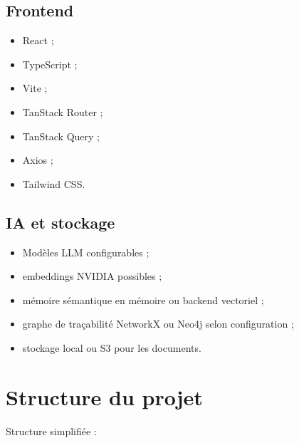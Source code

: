 \documentclass[
  french,
]{report}
\providecommand{\tightlist}{%
  \setlength{\itemsep}{0pt}\setlength{\parskip}{0pt}}
\begin{document}
\section{Frontend}\label{frontend-1}

\begin{itemize}
\tightlist
\item
  React ;
\item
  TypeScript ;
\item
  Vite ;
\item
  TanStack Router ;
\item
  TanStack Query ;
\item
  Axios ;
\item
  Tailwind CSS.
\end{itemize}

\section{IA et stockage}\label{ia-et-stockage}

\begin{itemize}
\tightlist
\item
  Modèles LLM configurables ;
\item
  embeddings NVIDIA possibles ;
\item
  mémoire sémantique en mémoire ou backend vectoriel ;
\item
  graphe de traçabilité NetworkX ou Neo4j selon configuration ;
\item
  stockage local ou S3 pour les documents.
\end{itemize}

\chapter{Structure du projet}\label{structure-du-projet}

Structure simplifiée :
\end{document}

